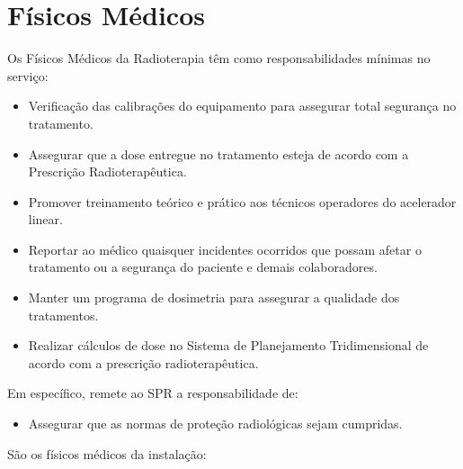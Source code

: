 \section{Físicos Médicos}
Os Físicos Médicos da Radioterapia têm como responsabilidades mínimas no serviço:
\begin{itemize}
    \item Verificação das calibrações do equipamento para assegurar total segurança no tratamento.
    \item Assegurar que a dose entregue no tratamento esteja de acordo com a Prescrição Radioterapêutica.
    \item Promover treinamento teórico e prático aos técnicos operadores do acelerador linear.
    \item Reportar ao médico quaisquer incidentes ocorridos que possam afetar o tratamento ou a segurança do paciente e demais colaboradores.
    \item Manter um programa de dosimetria para assegurar a qualidade dos tratamentos.
    \item Realizar cálculos de dose no Sistema de Planejamento Tridimensional de acordo com a prescrição radioterapêutica.
\end{itemize}

Em específico, remete ao SPR a responsabilidade de:
\begin{itemize}
    \item Assegurar que as normas de proteção radiológicas sejam cumpridas.
\end{itemize}

São os físicos médicos da instalação:

\begin{table}[!h]
    \centering
    \caption{Equipe de Físicos Médicos.}
    \label{tab:fisicos_medicos}
\end{table}

